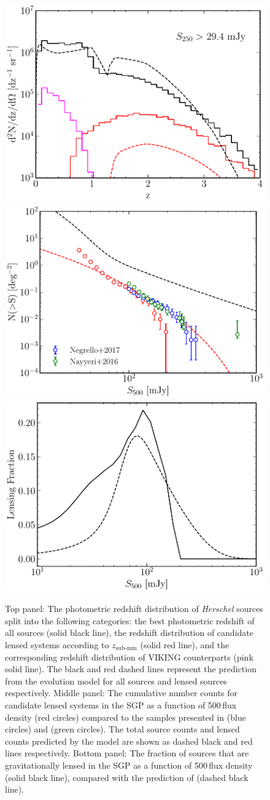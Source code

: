 \begin{figure}
    \centering
    \includegraphics[width=0.5\columnwidth,height=0.24\textheight]{Figures/lens_redshift_distribution.pdf}
    \includegraphics[width=0.5\columnwidth,height=0.24\textheight]{Figures/lens_number_counts.pdf}
    \includegraphics[width=0.5\columnwidth,height=0.24\textheight]{Figures/lensing_fraction.pdf}
    \caption{Top panel: The photometric redshift distribution of \textit{Herschel} sources split into the following categories: the best photometric redshift of all sources (solid black line), the redshift distribution of candidate lensed systems according to $z_{\textrm{sub-mm}}$ (solid red line), and the corresponding redshift distribution of VIKING counterparts (pink solid line). The black and red dashed lines represent the prediction from the \citealt{Cai_2013} evolution model for all sources and lensed sources respectively. Middle panel: The cumulative number counts for candidate lensed systems in the SGP as a function of 500\,\micron flux density (red circles) compared to the samples presented in \citealt{Negrello_2017} (blue circles) and \citealt{Nayyeri_2016} (green circles). The total source counts and lensed counts predicted by the \citealt{Cai_2013} model are shown as dashed black and red lines respectively. Bottom panel: The fraction of sources that are gravitationally lensed in the SGP as a function of 500\,\micron flux density (solid black line), compared with the prediction of \citealt{Cai_2013} (dashed black line).
    \label{fig:lens_distributions_against_cai}}
\end{figure}

